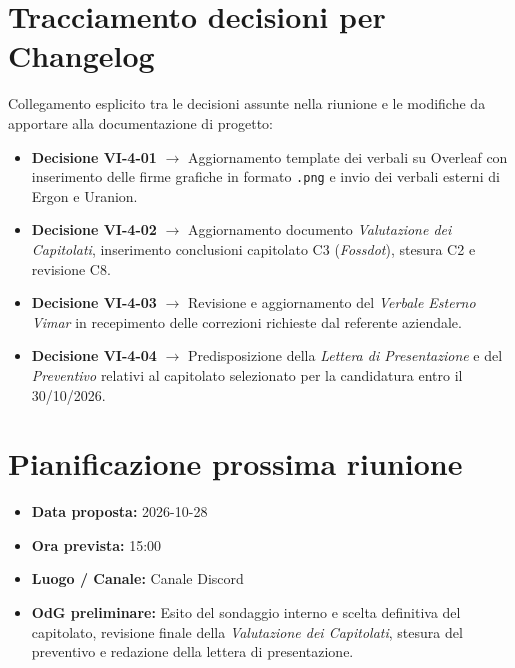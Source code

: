\documentclass[12pt,a4paper]{article}
\newcommand{\tightlist}{\setlength{\itemsep}{1pt}\setlength{\parskip}{0pt}}
\begin{document}
\hypertarget{tracciamento-decisioni}{%
\section{Tracciamento decisioni per Changelog}}

Collegamento esplicito tra le decisioni assunte nella riunione e le modifiche da apportare alla documentazione di progetto:

\begin{itemize}
\tightlist
\item \textbf{Decisione VI-4-01} $\rightarrow$ Aggiornamento template dei verbali su Overleaf con inserimento delle firme grafiche in formato \texttt{.png} e invio dei verbali esterni di Ergon e Uranion.
\item \textbf{Decisione VI-4-02} $\rightarrow$ Aggiornamento documento \emph{Valutazione dei Capitolati}, inserimento conclusioni capitolato C3 (\emph{Fossdot}), stesura C2 e revisione C8.
\item \textbf{Decisione VI-4-03} $\rightarrow$ Revisione e aggiornamento del \emph{Verbale Esterno Vimar} in recepimento delle correzioni richieste dal referente aziendale.
\item \textbf{Decisione VI-4-04} $\rightarrow$ Predisposizione della \emph{Lettera di Presentazione} e del \emph{Preventivo} relativi al capitolato selezionato per la candidatura entro il 30/10/2026.
\end{itemize}

\hypertarget{prossima-riunione}{%
\section{Pianificazione prossima riunione}}

\begin{itemize}
\tightlist
\item \textbf{Data proposta:} 2026-10-28
\item \textbf{Ora prevista:} 15:00
\item \textbf{Luogo / Canale:} Canale Discord
\item \textbf{OdG preliminare:} Esito del sondaggio interno e scelta definitiva del capitolato, revisione finale della \emph{Valutazione dei Capitolati}, stesura del preventivo e redazione della lettera di presentazione.
\end{itemize}
\end{document}

